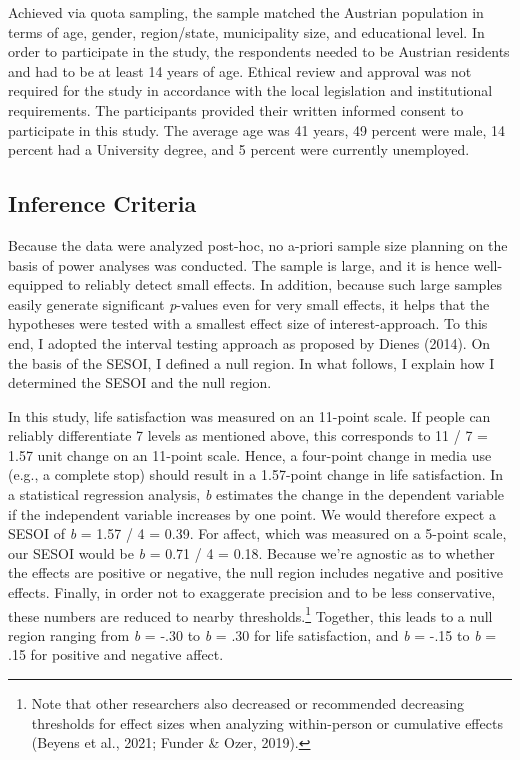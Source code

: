 \documentclass[
  man,mask]{apa7}
\begin{document}
Achieved via quota sampling, the sample matched the Austrian population in terms of age, gender, region/state, municipality size, and educational level.
In order to participate in the study, the respondents needed to be Austrian residents and had to be at least 14 years of age.
Ethical review and approval was not required for the study in accordance with the local legislation and institutional requirements.
The participants provided their written informed consent to participate in this study.
The average age was 41 years, 49 percent were male, 14 percent had a University degree, and 5 percent were currently unemployed.

\hypertarget{inference-criteria}{%
\subsection{Inference Criteria}\label{inference-criteria}}

Because the data were analyzed post-hoc, no a-priori sample size planning on the basis of power analyses was conducted.
The sample is large, and it is hence well-equipped to reliably detect small effects.
In addition, because such large samples easily generate significant \emph{p}-values even for very small effects, it helps that the hypotheses were tested with a smallest effect size of interest-approach.
To this end, I adopted the interval testing approach as proposed by Dienes (2014).
On the basis of the SESOI, I defined a null region.
In what follows, I explain how I determined the SESOI and the null region.

In this study, life satisfaction was measured on an 11-point scale.
If people can reliably differentiate 7 levels as mentioned above, this corresponds to 11 / 7 = 1.57 unit change on an 11-point scale.
Hence, a four-point change in media use (e.g., a complete stop) should result in a 1.57-point change in life satisfaction.
In a statistical regression analysis, \emph{b} estimates the change in the dependent variable if the independent variable increases by one point.
We would therefore expect a SESOI of \emph{b} = 1.57 / 4 = 0.39.
For affect, which was measured on a 5-point scale, our SESOI would be \emph{b} = 0.71 / 4 = 0.18.
Because we're agnostic as to whether the effects are positive or negative, the null region includes negative and positive effects.
Finally, in order not to exaggerate precision and to be less conservative, these numbers are reduced to nearby thresholds.\footnote{Note that other researchers also decreased or recommended decreasing thresholds for effect sizes when analyzing within-person or cumulative effects (Beyens et al., 2021; Funder \& Ozer, 2019).}
Together, this leads to a null region ranging from \emph{b} = -.30 to \emph{b} = .30 for life satisfaction, and \emph{b} = -.15 to \emph{b} = .15 for positive and negative affect.
\end{document}
